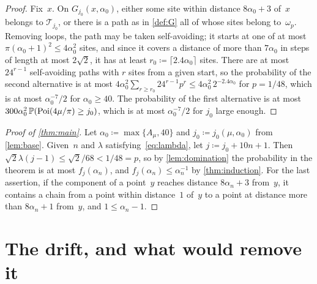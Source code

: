 \documentclass[11pt,letterpaper]{article}
\newcommand{\cT}{\mathcal T}
\begin{document}
\begin{proof}
Fix~$x$. On $G_{j_0}(x,\alpha_0)$, either some site within distance $8\alpha_0+3$ of~$x$ belongs to $\cT_{j_0}$, or there is a path as in \cref{def:G} all of whose sites belong to~$\omega_p$. Removing loops, the path may be taken self-avoiding; it starts at one of at most $\pi(\alpha_0+1)^2\le4\alpha_0^2$ sites, and since it covers a distance of more than $7\alpha_0$ in steps of length at most $2\sqrt2$, it has at least $r_0\coloneqq\lceil2.4\alpha_0\rceil$ sites. There are at most $24^{r-1}$ self-avoiding paths with $r$ sites from a given start, so the probability of the second alternative is at most $4\alpha_0^2\sum_{r\ge r_0}24^{r-1}p^r\le4\alpha_0^2\,2^{-2.4\alpha_0}$ for $p=1/48$, which is at most $\alpha_0^{-7}/2$ for $\alpha_0\ge40$. The probability of the first alternative is at most $300\alpha_0^2\,\P(\mathrm{Poi}(4\mu/\pi)\ge j_0)$, which is at most $\alpha_0^{-7}/2$ for $j_0$ large enough.
\end{proof}

\begin{proof}[Proof of \cref{thm:main}]
Let $\alpha_0\coloneqq\max\{A_\mu,40\}$ and $j_0\coloneqq j_0(\mu,\alpha_0)$ from \cref{lem:base}. Given~$n$ and $\lambda$ satisfying~\eqref{eq:lambda}, let $j\coloneqq j_0+10n+1$. Then $\sqrt2\lambda(j-1)\le\sqrt2/68<1/48=p$, so by \cref{lem:domination} the probability in the theorem is at most $f_j(\alpha_n)$, and $f_j(\alpha_n)\le\alpha_n^{-1}$ by \cref{thm:induction}. For the last assertion, if the component of a point~$y$ reaches distance $8\alpha_n+3$ from~$y$, it contains a chain from a point within distance~$1$ of~$y$ to a point at distance more than $8\alpha_n+1$ from~$y$, and $1\le\alpha_n-1$.
\end{proof}

\section{The drift, and what would remove it}
\label{sec:drift}
\end{document}
